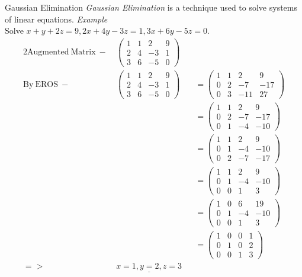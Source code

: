 \documentclass[11pt,a4paper]{article}
\begin{document}
\subtitle{Theorem 3.21 - }{Gaussian Elimination}
\textit{Gaussian Elimination} is a technique used to solve systems of linear equations.
\textit{Example} \\
Solve $x + y + 2z = 9, 2x + 4y - 3z = 1, 3x + 6y - 5z = 0$.
\begin{alignat*}{2}
  \mathrm{Augmented\ Matrix\ -\ } &\begin{pmatrix}
    1 & 1 & 2 & 9 \\
    2 & 4 & -3 & 1 \\
    3 & 6 & -5 & 0
  \end{pmatrix} && \\
  \mathrm{By\ EROS\ -\ } &\begin{pmatrix}
    1 & 1 & 2 & 9 \\
    2 & 4 & -3 & 1 \\
    3 & 6 & -5 & 0
  \end{pmatrix} &&= \begin{pmatrix}
    1 & 1 & 2 & 9 \\
    0 & 2 & -7 & -17 \\
    0 & 3 & -11 & 27
  \end{pmatrix} \\ &  &&= \begin{pmatrix}
    1 & 1 & 2 & 9 \\
    0 & 2 & -7 & -17 \\
    0 & 1 & -4 & -10
  \end{pmatrix} \\ & &&= \begin{pmatrix}
    1 & 1 &2 & 9 \\
    0 & 1 & -4 & -10 \\
    0 & 2 & -7 & -17
  \end{pmatrix} \\ & &&= \begin{pmatrix}
    1 & 1 & 2 & 9 \\
    0 & 1 & -4 & -10 \\
    0 & 0 & 1 & 3
  \end{pmatrix} \\ & &&= \begin{pmatrix}
    1 & 0 & 6 & 19 \\
    0 & 1 & -4 & -10 \\
    0 & 0 & 1 & 3
  \end{pmatrix}\\ & &&= \begin{pmatrix}
    1 & 0 & 0 & 1 \\
    0 & 1 & 0 & 2 \\
    0 & 0 & 1 & 3
  \end{pmatrix}\\
  => & \underline{x = 1, y= 2, z = 3}
\end{alignat*}
\end{document}

